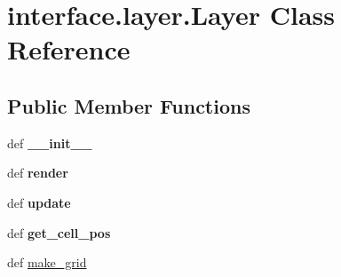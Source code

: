 \hypertarget{classinterface_1_1layer_1_1_layer}{\section{interface.\-layer.\-Layer \-Class \-Reference}
\label{classinterface_1_1layer_1_1_layer}
}
\subsection*{\-Public \-Member \-Functions}
\begin{DoxyCompactItemize}
\item 
\hypertarget{classinterface_1_1layer_1_1_layer_ab9b02ee5672b0222065ac7d8148b6c9c}{def {\bfseries \-\_\-\-\_\-init\-\_\-\-\_\-}}\label{classinterface_1_1layer_1_1_layer_ab9b02ee5672b0222065ac7d8148b6c9c}

\item 
\hypertarget{classinterface_1_1layer_1_1_layer_ae5bf1cf30133971912c978524741098e}{def {\bfseries render}}\label{classinterface_1_1layer_1_1_layer_ae5bf1cf30133971912c978524741098e}

\item 
\hypertarget{classinterface_1_1layer_1_1_layer_a6e98a961961ea7d430adac46d3c29719}{def {\bfseries update}}\label{classinterface_1_1layer_1_1_layer_a6e98a961961ea7d430adac46d3c29719}

\item 
\hypertarget{classinterface_1_1layer_1_1_layer_a5b1411d03b84e5b0d0a86a6c58eba3a5}{def {\bfseries get\-\_\-cell\-\_\-pos}}\label{classinterface_1_1layer_1_1_layer_a5b1411d03b84e5b0d0a86a6c58eba3a5}

\item 
def \hyperlink{classinterface_1_1layer_1_1_layer_a36c73749e127ff1d97ca205cd544c07d}{make\-\_\-grid}
\end{DoxyCompactItemize}
